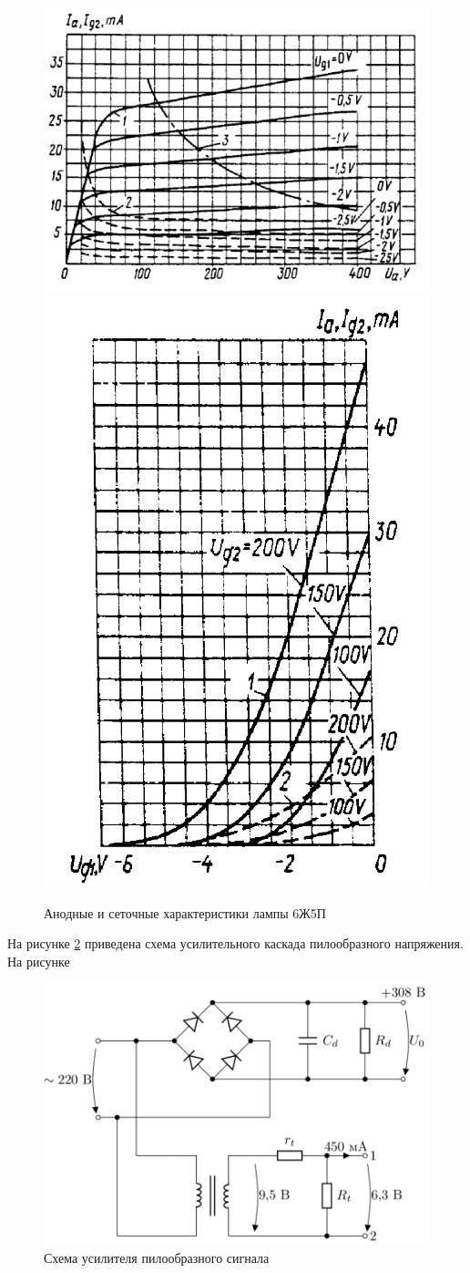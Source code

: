 \documentclass[a4paper,14pt]{extarticle}
\begin{document}
    \begin{figure}[!h]
    	\begin{center}
    		\includegraphics[width=.6\textwidth]{images/6z5p1.png}
    		\includegraphics[width=.3\textwidth]{images/6z5p2.png}
    	\end{center}
    	\caption{Анодные и сеточные характеристики лампы 6Ж5П}
    	\label{fig6z5p}
    \end{figure}
    
    На рисунке \ref{figcasc} приведена схема усилительного каскада пилообразного напряжения. На рисунке 
    
    \begin{figure}[!h]
        \begin{center}
            \includegraphics[width=.4\textwidth]{images/amplifier_.png}
        \end{center}
        \caption{Схема усилителя пилообразного сигнала}
        \label{figcasc}
    \end{figure}
    
\end{document}
